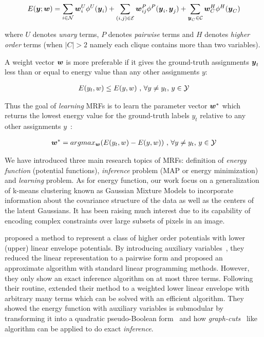 \begin{align}
  \label{eq:energyfunction_UPH}
  E({\boldsymbol{y}};{\boldsymbol{w}})=\sum_{i\in {\cal N}}{{\boldsymbol{w}}_i^U\phi^U({\boldsymbol{y}}_i)}+
  \sum_{(i,j)\in {\cal E}}{{\boldsymbol{w}}_{ij}^P\phi^P({\boldsymbol{y}}_i,{\boldsymbol{y}}_j)}+
  \sum_{{\boldsymbol{y}}_C\in {\cal C}}{{\boldsymbol{w}}_C^H\phi^H({\boldsymbol{y}}_C)}
\end{align}

\noindent where $U$ denotes \emph{unary} terms, $P$ denotes
\emph{pairwise} terms and $H$ denotes \emph{higher order} terms
(when $|C|>2$ namely each clique contains more than two
variables).

A weight vector ${\boldsymbol{w}}$ is more preferable if it gives the
ground-truth assignments ${\boldsymbol{y}}_t$ less than or equal to energy
value than any other assignments $y$:

\begin{align}
E(y_t,w)\leq E(y,w)~ \text{,~}\forall y \neq y_t
\text{,~} y\in {\cal Y}
\end{align}


Thus the goal of \emph{learning} MRFs is to learn the parameter
vector ${\boldsymbol{w}}^*$ which returns the lowest energy value for the
ground-truth labels $y_t$ relative to any other assignments
$y$~\cite{Szummer:ECCV08}:

\begin{align}
{\boldsymbol{w}}^* = argmax_{{\boldsymbol{w}}}(E(y_t,w)-E(y,w))~ \text{,~}\forall y \neq y_t
\text{,~} y\in {\cal Y}
\end{align}

We have introduced three main research topics of MRFs: definition
of \emph{energy function} (potential functions), \emph{inference}
problem (MAP or energy minimization) and \emph{learning} problem.
As for energy function, our work focus on a generalization of
k-means clustering known as Gaussian Mixture Models to
incorporate information about the covariance structure of the
data as well as the centers of the latent Gaussians. It has been
raising much interest due to its capability of encoding complex
constraints over large subsets of pixels in an image.

 proposed a method to represent a class
of higher order potentials with lower (upper) linear envelope
potentials. By introducing auxiliary
variables~\cite{Kohli:CVPR10}, they reduced the linear
representation to a pairwise form and proposed an approximate
algorithm with standard linear programming methods. However, they
only show an exact inference algorithm on at most three terms.
Following their routine,  extended their
method to a weighted lower linear envelope with arbitrary many
terms which can be solved with an efficient algorithm. They
showed the energy function with auxiliary variables is submodular
by transforming it into a quadratic pseudo-Boolean
form~\cite{Boros:MATH02} and how
\emph{graph-cuts}~\cite{Hammer:1965, Boykov:ICCV01,
  Freedman:CVPR05} like algorithm can be applied to do exact
\emph{inference}.

